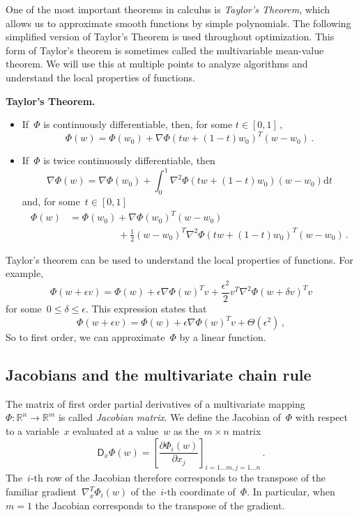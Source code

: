 \documentclass{tufte-book}
\begin{document}
One of the most important theorems in calculus is \emph{Taylor's
Theorem}, which allows us to approximate smooth functions by simple
polynomials. The following simplified version of Taylor's Theorem is
used throughout optimization. This form of Taylor's theorem is sometimes
called the multivariable mean-value theorem. We will use this at
multiple points to analyze algorithms and understand the local
properties of functions.

\begin{Theorem}

\textbf{Taylor's Theorem.}

\begin{itemize}
\item
  If~\(\Phi\) is continuously differentiable, then, for some
  \(t \in [0,1]\,,\)
  \[\Phi(w) = \Phi(w_0) + \nabla \Phi(tw + (1-t)w_0)^T (w - w_0)\,.\]
\item
  If~\(\Phi\) is twice continuously differentiable, then \[
  \nabla \Phi(w) = \nabla \Phi(w_0) + \int_0^1 \nabla^2 \Phi(tw + (1-t)w_0)(w - w_0) \mathrm{d}t
  \] and, for some~\(t \in [0,1]\) \[
  \begin{aligned}
  \Phi(w) &= \Phi(w_0) + \nabla \Phi(w_0)^T(w - w_0) \\
  &\qquad\qquad\quad+ \frac{1}{2} (w-w_0)^T \nabla^2 \Phi(tw + (1-t)w_0)^T (w - w_0)\,.
  \end{aligned}
  \]
\end{itemize}

\end{Theorem}

Taylor's theorem can be used to understand the local properties of
functions. For example, \[
  \Phi(w+ \epsilon v) = \Phi(w) + \epsilon \nabla \Phi(w)^Tv + \frac{\epsilon^2}{2} v^T \nabla^2 \Phi(w + \delta v)^T v
\] for some~\(0\leq \delta \leq \epsilon\). This expression states that
\[
  \Phi(w+ \epsilon v) = \Phi(w) + \epsilon \nabla \Phi(w)^Tv + \Theta(\epsilon^2)\,,
\] So to first order, we can approximate~\(\Phi\) by a linear function.

\hypertarget{jacobians-and-the-multivariate-chain-rule}{%
\subsection{Jacobians and the multivariate chain
rule}\label{jacobians-and-the-multivariate-chain-rule}}

The matrix of first order partial derivatives of a multivariate mapping
\(\Phi\colon\mathbb{R}^n\to\mathbb{R}^m\) is called \emph{Jacobian
matrix}. We define the Jacobian of~\(\Phi\) with respect
to a variable~\(x\) evaluated at a value~\(w\) as the~\(m\times n\)
matrix \[
\mathsf{D}_x \Phi(w)
= \left[
  \frac{\partial \Phi_i(w)}{\partial x_j} 
\right]_{i=1\dots m, j=1\dots n}\,.
\] The~\(i\)-th row of the Jacobian therefore corresponds to the
transpose of the familiar gradient~\(\nabla_x^T \Phi_i(w)\) of
the~\(i\)-th coordinate of~\(\Phi\). In particular, when~\(m=1\) the
Jacobian corresponds to the transpose of the gradient.
\end{document}
